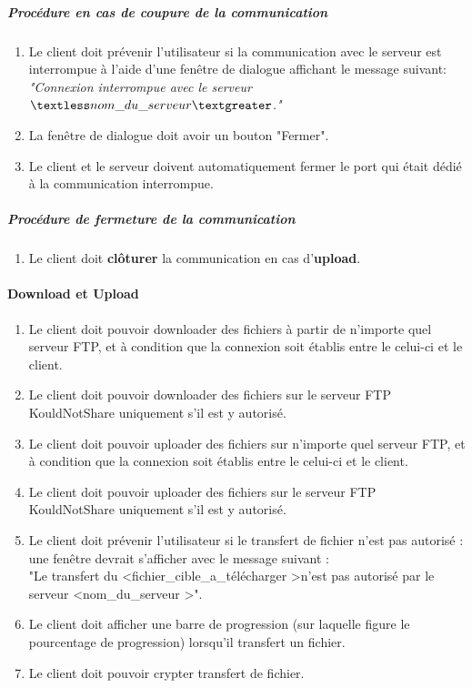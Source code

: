 \documentclass[10pt,a4paper]{report}
\begin{document}
	\subparagraph{Procédure en cas de coupure de la communication}

		\begin{enumerate}
			\item Le client doit prévenir l'utilisateur si la communication avec le serveur est interrompue à l'aide d'une fenêtre de dialogue affichant le message suivant:\\
\textit{"Connexion interrompue avec le serveur $\textless nom\_du\_serveur\textgreater$."}

			\item La fenêtre de dialogue doit avoir un bouton "Fermer".

			\item Le client et le serveur doivent automatiquement fermer le port qui était dédié à la communication interrompue.
		\end{enumerate}
		
	\subparagraph{Procédure de fermeture de la communication}

		\begin{enumerate}
			\item Le client doit \textbf{clôturer} la communication en cas d'\textbf{upload}. 
		\end{enumerate}
		
\paragraph{Download et Upload}

	\begin{enumerate}
		\item Le client doit pouvoir downloader des fichiers à partir de n'importe quel serveur FTP, et à condition que la connexion soit établis entre le celui-ci et le client.
		\item Le client doit pouvoir downloader des fichiers sur le serveur FTP KouldNotShare uniquement s'il est y autorisé.
		\item Le client doit pouvoir uploader des fichiers sur n'importe quel serveur FTP, et à condition que la connexion soit établis entre le celui-ci et le client.
		\item Le client doit pouvoir uploader des fichiers sur le serveur FTP KouldNotShare uniquement s'il est y autorisé.
		\item Le client doit prévenir l'utilisateur si le transfert de fichier n'est pas autorisé : une fenêtre devrait s'afficher avec le message suivant :\\
		 "Le transfert du \textless fichier\_cible\_a\_télécharger \textgreater n'est pas autorisé par le serveur \textless nom\_du\_serveur \textgreater ".
		\item Le client doit afficher une barre de progression (sur laquelle figure le pourcentage de progression) lorsqu'il transfert un fichier.
		\item Le client doit pouvoir crypter transfert de fichier. 
	\end{enumerate}
\end{document}
